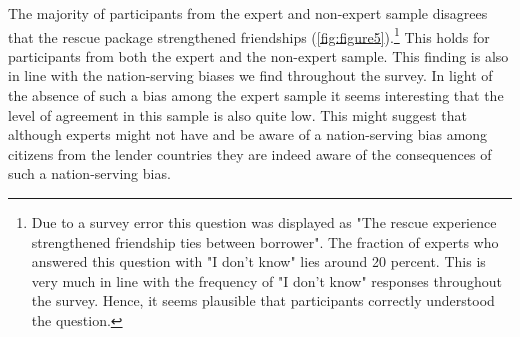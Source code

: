 The majority of participants from the expert and non-expert sample disagrees that 
the rescue package strengthened friendships (\autoref{fig:figure5}).\footnote{Due to a survey error this question was displayed as "The rescue experience strengthened friendship ties between borrower". The fraction of experts who answered this question with "I don't know" lies around 20 percent. This is very much in line with the frequency of "I don't know" responses throughout the survey. Hence, it seems plausible that participants correctly understood the question. } This holds for participants from 
both the expert and the non-expert sample. This finding is also in line with the nation-serving biases
we find throughout the survey. In light of the absence of such a bias among the expert sample 
it seems interesting that the level of agreement in this sample is also quite low. 
This might suggest that although experts might not have and be aware of a nation-serving bias
among citizens from the lender countries they are indeed aware of the consequences of such 
a nation-serving bias. 

